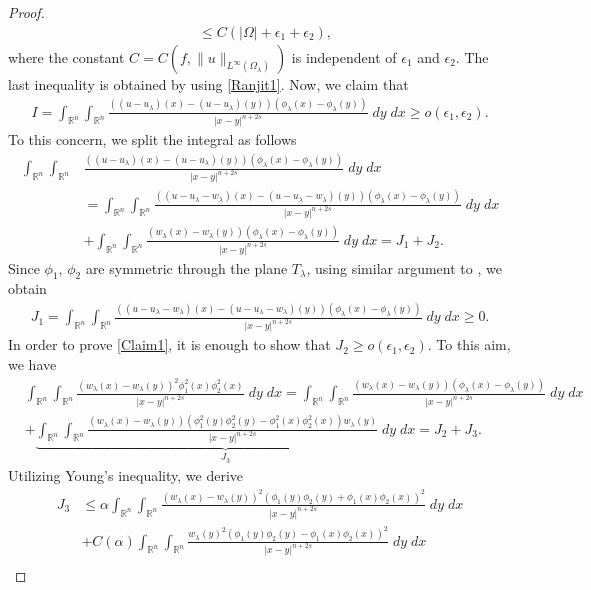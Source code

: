 \documentclass[11pt, notitlepage]{article}
\def\R{\mathbb{R}}
\begin{document}
{\begin{proof}
\begin{align}
    &\leq C(|\Omega|+\epsilon_1+\epsilon_2),
\end{align}
where the constant $C=C(f,\|u\|_{L^\infty(\Omega_\lambda)})$ is independent of $\epsilon_1$ and $\epsilon_2$. The last inequality is obtained by using \eqref{Ranjit1}.
Now, we claim that
\begin{align}\label{Claim1}
   I=\int_{\R^n}\int_{\R^n}\frac{((u-u_\lambda)(x)-(u-u_\lambda)(y))(\phi_\lambda(x)-\phi_\lambda(y))}{|x-y|^{n+2s}}\;dy\;dx\geq o(\epsilon_1,\epsilon_2).
\end{align}
To this concern, we split the integral as follows
\begin{align*}
   \int_{\R^n}\int_{\R^n}&\frac{((u-u_\lambda)(x)-(u-u_\lambda)(y))(\phi_\lambda(x)-\phi_\lambda(y))}{|x-y|^{n+2s}}\;dy\;dx\nonumber\\
   &=\int_{\R^n}\int_{\R^n}\frac{((u-u_\lambda-w_\lambda)(x)-(u-u_\lambda-w_\lambda)(y))(\phi_\lambda(x)-\phi_\lambda(y))}{|x-y|^{n+2s}}\;dy\;dx\nonumber\\
   &+\int_{\R^n}\int_{\R^n}\frac{(w_\lambda(x)-w_\lambda(y))(\phi_\lambda(x)-\phi_\lambda(y))}{|x-y|^{n+2s}}\;dy\;dx=J_1+J_2.
\end{align*}
Since $\phi_1,\,\phi_2$ are symmetric through the plane $T_\lambda$, using similar argument to \cite[Inequality (3.11), page 949]{Luigi18}, we obtain
\begin{align*}
    J_1=\int_{\R^n}\int_{\R^n}\frac{((u-u_\lambda-w_\lambda)(x)-(u-u_\lambda-w_\lambda)(y))(\phi_\lambda(x)-\phi_\lambda(y))}{|x-y|^{n+2s}}\;dy\;dx\geq 0.
\end{align*} 
In order to prove \eqref{Claim1}, it is enough to show that $J_2\geq o(\epsilon_1,\epsilon_2).$
To this aim, we have
\begin{align}\label{Ra1}
    &\int_{\R^n}\int_{\R^n}\frac{(w_\lambda(x)-w_\lambda(y))^2\phi_1^2(x)\phi_2^2(x)}{|x-y|^{n+2s}}\;dy\;dx=\int_{\R^n}\int_{\R^n}\frac{(w_\lambda(x)-w_\lambda(y))(\phi_\lambda(x)-\phi_\lambda(y))}{|x-y|^{n+2s}}\;dy\;dx\nonumber\\
    &+\underbrace{\int_{\R^n}\int_{\R^n}\frac{(w_\lambda(x)-w_\lambda(y))(\phi_1^2(y)\phi_2^2(y)-\phi_1^2(x)\phi_2^2(x))w_\lambda(y)}{|x-y|^{n+2s}}\;dy\;dx}_{J_3}=J_2+J_3.
\end{align}
Utilizing Young's inequality, we derive
\begin{align*}
    J_3&\leq \alpha \int_{\R^n}\int_{\R^n}\frac{(w_\lambda(x)-w_\lambda(y))^2(\phi_1(y)\phi_2(y)+\phi_1(x)\phi_2(x))^2}{|x-y|^{n+2s}}\;dy\;dx\nonumber\\
    &+C(\alpha)\int_{\R^n}\int_{\R^n}\frac{w_\lambda(y)^2(\phi_1(y)\phi_2(y)-\phi_1(x)\phi_2(x))^2}{|x-y|^{n+2s}}\;dy\;dx\nonumber\\

\end{align*}
\end{proof}}
\end{document}
